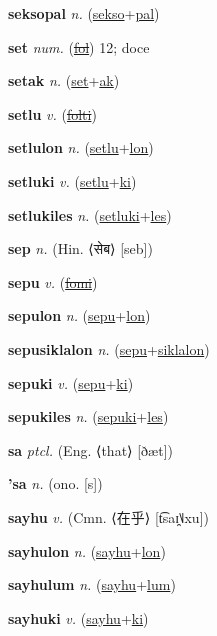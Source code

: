 \textbf{\hypertarget{seksopal}{seksopal}} \textit{n.} (\hyperlink{sekso}{sekso}+\allowbreak \hyperlink{pal}{pal})


\textbf{\hypertarget{set}{set}} \textit{num.} (\hyperlink{fol}{\sout{fol}})
12; doce

\textbf{\hypertarget{setak}{setak}} \textit{n.} (\hyperlink{set}{set}+\allowbreak \hyperlink{ak}{ak})


\textbf{\hypertarget{setlu}{setlu}} \textit{v.} (\hyperlink{folti}{\sout{folti}})


\textbf{\hypertarget{setlulon}{setlulon}} \textit{n.} (\hyperlink{setlu}{setlu}+\allowbreak \hyperlink{lon}{lon})


\textbf{\hypertarget{setluki}{setluki}} \textit{v.} (\hyperlink{setlu}{setlu}+\allowbreak \hyperlink{ki}{ki})


\textbf{\hypertarget{setlukiles}{setlukiles}} \textit{n.} (\hyperlink{setluki}{setluki}+\allowbreak \hyperlink{les}{les})


\textbf{\hypertarget{sep}{sep}} \textit{n.} (Hin. ⟨{\devanagari{}सेब}⟩ [seb])


\textbf{\hypertarget{sepu}{sepu}} \textit{v.} (\hyperlink{fomi}{\sout{fomi}})


\textbf{\hypertarget{sepulon}{sepulon}} \textit{n.} (\hyperlink{sepu}{sepu}+\allowbreak \hyperlink{lon}{lon})


\textbf{\hypertarget{sepusiklalon}{sepusiklalon}} \textit{n.} (\hyperlink{sepu}{sepu}+\allowbreak \hyperlink{siklalon}{siklalon})


\textbf{\hypertarget{sepuki}{sepuki}} \textit{v.} (\hyperlink{sepu}{sepu}+\allowbreak \hyperlink{ki}{ki})


\textbf{\hypertarget{sepukiles}{sepukiles}} \textit{n.} (\hyperlink{sepuki}{sepuki}+\allowbreak \hyperlink{les}{les})


\textbf{\hypertarget{sa}{sa}} \textit{ptcl.} (Eng. ⟨that⟩ [ðæt])


\textbf{\hypertarget{'sa}{'sa}} \textit{n.} (ono. [s])


\textbf{\hypertarget{sayhu}{sayhu}} \textit{v.} (Cmn. ⟨{\chinese{}在乎}⟩ [t͡saɪ̯˥˩xu])


\textbf{\hypertarget{sayhulon}{sayhulon}} \textit{n.} (\hyperlink{sayhu}{sayhu}+\allowbreak \hyperlink{lon}{lon})


\textbf{\hypertarget{sayhulum}{sayhulum}} \textit{n.} (\hyperlink{sayhu}{sayhu}+\allowbreak \hyperlink{lum}{lum})


\textbf{\hypertarget{sayhuki}{sayhuki}} \textit{v.} (\hyperlink{sayhu}{sayhu}+\allowbreak \hyperlink{ki}{ki})


